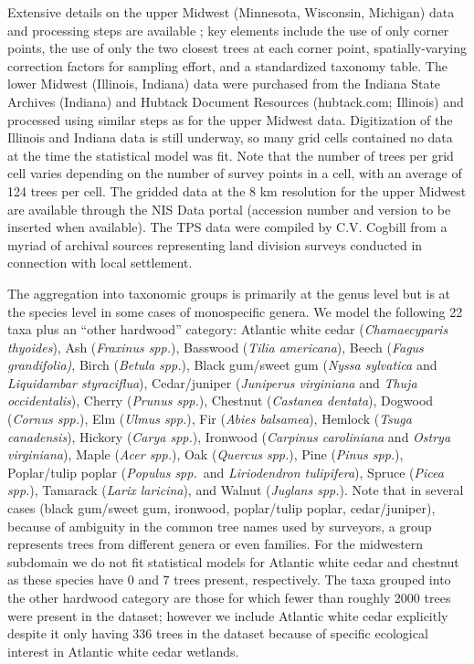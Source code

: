 \documentclass[10pt,letterpaper]{article}
\begin{document}
Extensive details on the upper Midwest (Minnesota, Wisconsin, Michigan)
data and processing steps are available \cite{goring2015tr};
key elements include the use of only corner points, the use of only
the two closest trees at each corner point, spatially-varying correction
factors for sampling effort, and a standardized taxonomy table. The
lower Midwest (Illinois, Indiana) data were purchased from the Indiana
State Archives (Indiana) and Hubtack Document Resources (hubtack.com;
Illinois) and processed using similar steps as for the upper Midwest
data. Digitization of the Illinois and Indiana data is still underway,
so many grid cells contained no data at the time the statistical model
was fit. Note that the number of trees per grid cell varies depending
on the number of survey points in a cell, with an average of 124 trees
per cell. The gridded data at the 8 km resolution for the upper Midwest
are available through the NIS Data portal (accession number and version
to be inserted when available). The TPS data were compiled by C.V.
Cogbill from a myriad of archival sources representing land division
surveys conducted in connection with local settlement. 

The aggregation into taxonomic groups is primarily at the genus level
but is at the species level in some cases of monospecific genera.
We model the following 22 taxa plus an ``other hardwood'' category:
Atlantic white cedar (\emph{Chamaecyparis thyoides}), Ash (\emph{Fraxinus
spp.}), Basswood (\emph{Tilia americana}), Beech (\emph{Fagus grandifolia)},
Birch (\emph{Betula spp.}), Black gum/sweet gum (\emph{Nyssa sylvatica}
and \emph{Liquidambar styraciflua}), Cedar/juniper (\emph{Juniperus
virginiana} and \emph{Thuja occidentalis}), Cherry (\emph{Prunus spp.}),
Chestnut (\emph{Castanea dentata}), Dogwood (\emph{Cornus spp.}),
Elm (\emph{Ulmus spp.}), Fir (\emph{Abies balsamea}), Hemlock (\emph{Tsuga
canadensis}), Hickory (\emph{Carya spp.}), Ironwood (\emph{Carpinus
caroliniana} and \emph{Ostrya virginiana}), Maple (\emph{Acer spp.}),
Oak (\emph{Quercus spp.}), Pine (\emph{Pinus spp.}), Poplar/tulip
poplar (\emph{Populus spp.}~and \emph{Liriodendron tulipifera}),
Spruce (\emph{Picea spp.}), Tamarack (\emph{Larix laricina}), and
Walnut (\emph{Juglans spp.}). Note that in several cases (black gum/sweet
gum, ironwood, poplar/tulip poplar, cedar/juniper), because of ambiguity
in the common tree names used by surveyors, a group represents trees
from different genera or even families. For the midwestern subdomain
we do not fit statistical models for Atlantic white cedar and chestnut
as these species have 0 and 7 trees present, respectively. The taxa
grouped into the other hardwood category are those for which fewer
than roughly 2000 trees were present in the dataset; however we include
Atlantic white cedar explicitly despite it only having 336 trees in
the dataset because of specific ecological interest in Atlantic white
cedar wetlands. 
\end{document}
